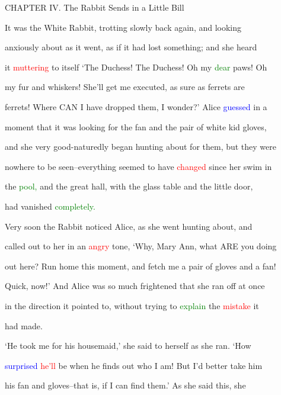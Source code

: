  CHAPTER IV. The Rabbit Sends in a Little Bill



 It was the \textcolor{BurntOrange}{White} Rabbit, trotting slowly back again, and looking

 anxiously about as it went, as if it had \textcolor{BurntOrange}{lost} something; and she heard

 it \textcolor{red}{muttering} to itself ‘The Duchess! The Duchess! Oh my \textcolor{green}{dear} paws! Oh

 my fur and whiskers! \textcolor{BurntOrange}{She’ll} get me executed, as sure as ferrets are

 ferrets! Where CAN I have dropped them, I wonder?’ Alice \textcolor{blue}{guessed} in a

 moment that it was looking for the fan and the pair of \textcolor{BurntOrange}{white} kid gloves,

 and she very good-naturedly began hunting about for them, but they were

 nowhere to be seen--everything seemed to have \textcolor{red}{changed} since her \textcolor{BurntOrange}{swim} in

 the \textcolor{green}{pool,} and the great hall, with the glass table and the little door,

 had \textcolor{BurntOrange}{vanished} \textcolor{green}{completely.}



 Very soon the Rabbit noticed Alice, as she went hunting about, and

 called out to her in an \textcolor{red}{angry} tone, ‘Why, Mary Ann, what ARE you doing

 out here? Run home this moment, and fetch me a pair of gloves and a fan!

 Quick, now!’ And Alice was so much \textcolor{BurntOrange}{frightened} that she ran off at once

 in the direction it pointed to, without trying to \textcolor{green}{explain} the \textcolor{red}{mistake} it

 had made.



 ‘He took me for his housemaid,’ she said to herself as she ran. ‘How

 \textcolor{blue}{surprised} \textcolor{red}{he’ll} be when he finds out who I am! But I’d better take him

 his fan and gloves--that is, if I can find them.’ As she said this, she

